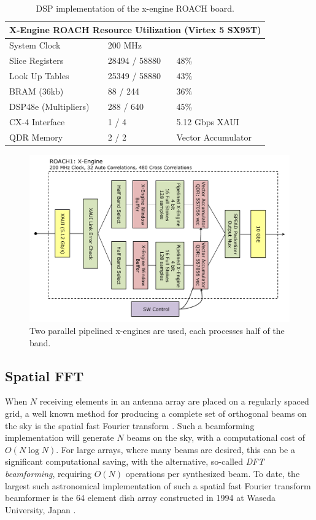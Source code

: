 \documentclass[useAMS,macros,usenatbib,onecolumn]{mn2e}
\begin{document}
\begin{table}
\begin{center}
\begin{tabular}{| l | l | l |}
\hline
\multicolumn{3}{|c|}{X-Engine ROACH Resource Utilization (Virtex 5 SX95T)}\\
\hline
System Clock & 200 MHz \\
Slice Registers & 28494 / 58880 & $48\%$\\
Look Up Tables & 25349 / 58880 & $43\%$\\
BRAM (36kb) & 88 / 244 & $36\%$\\
DSP48e (Multipliers) & 288 / 640 & $45\%$\\
CX-4 Interface & 1 / 4 & 5.12 Gbps XAUI\\
QDR Memory & 2 / 2 & Vector Accumulator\\
\hline
\end{tabular}
\caption{DSP implementation of the x-engine ROACH board.}
\label{tbl:xeng_resource}
\end{center}
\end{table}

\begin{figure}
    \centering
    \includegraphics[scale=0.6]{graphics/crop_xengine_block.pdf}
    \caption{Two parallel pipelined x-engines are used, each processes half of the band.}
    \label{fig:xeng_block}
\end{figure}

\subsection{Spatial FFT}
\label{s-engine}
 
When $N$ receiving elements in an antenna array are placed on a regularly spaced grid, a well known method for producing a complete set of orthogonal beams on the sky is the spatial fast Fourier transform \citep{fastbeamforming}.
Such a beamforming implementation will generate $N$ beams on the sky, with a computational cost of $O(N\log{N})$. For large arrays, where many beams are desired, this can be a significant computational saving, with the alternative, so-called \emph{DFT beamforming}, requiring $O(N)$ operations per synthesized beam.
To date, the largest such astronomical implementation of such a spatial fast Fourier transform beamformer is the 64 element dish array constructed in 1994 at Waseda University, Japan \citep{2dfft}.
\end{document}

